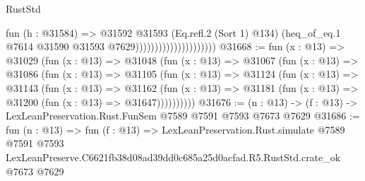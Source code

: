 \begin{lexlean}{RustStd}
\begin{coremodule}
                                          fun (h : @31584) =>
                                          @31592
                                            @31593
                                            (Eq.refl.{2} (Sort 1) @134)
                                            (heq_of_eq.{1}
                                              @7614
                                              @31590
                                              @31593
                                              @7629)))))))))))))))))))))
@31668 := fun (x : @13) =>
  @31029
    (fun (x : @13) =>
    @31048
      (fun (x : @13) =>
      @31067
        (fun (x : @13) =>
        @31086
          (fun (x : @13) =>
          @31105
            (fun (x : @13) =>
            @31124
              (fun (x : @13) =>
              @31143
                (fun (x : @13) =>
                @31162
                  (fun (x : @13) =>
                  @31181 (fun (x : @13) => @31200 (fun (x : @13) => @31647))))))))))
@31676 := (n : @13) -> (f : @13) -> LexLeanPreservation.Rust.FunSem @7589 @7591 @7593 @7673 @7629
@31686 := fun (n : @13) =>
  fun (f : @13) =>
  LexLeanPreservation.Rust.simulate
    @7589
    @7591
    @7593
    LexLeanPreserve.C6621fb38d08ad39dd0c685a25d0acfad.R5.RustStd.crate_ok
    @7673
    @7629
\end{coremodule}
\end{lexlean}
